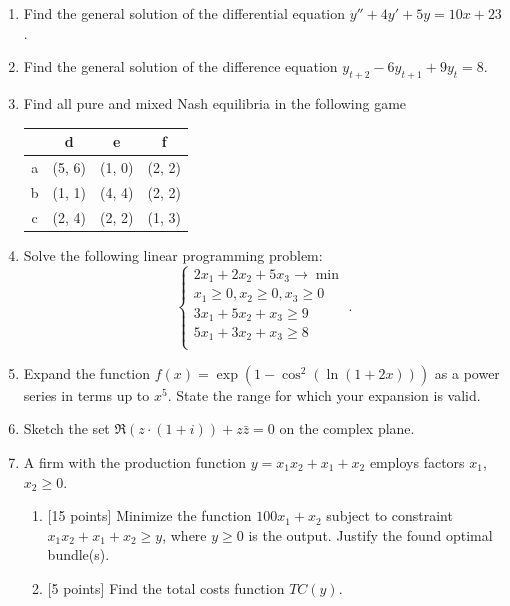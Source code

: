 \documentclass[12pt]{article} %
\theoremstyle{definition} %
\begin{document}
\begin{enumerate}
\item Find the general solution of the differential equation $y'' + 4y' + 5y = 10x+23$.
\item Find the general solution of the difference equation $y_{t+2} - 6y_{t+1} + 9y_t = 8$.
\item Find all pure and mixed Nash equilibria in the following game

\begin{center}
\begin{tabular}{@{}cccc@{}}
\toprule
  & d & e & f \\ \midrule
a & (5, 6) & (1, 0)  & (2, 2)   \\
b & (1, 1) & (4, 4) & (2, 2)   \\
c & (2, 4) & (2, 2) & (1, 3)   \\ \bottomrule
\end{tabular}
\end{center}

\item Solve the following linear programming problem:
\[
\begin{cases}
2x_1 + 2x_2 + 5x_3 \to \min \\
x_1 \geq 0, x_2 \geq 0, x_3 \geq 0 \\
3x_1 + 5x_2 + x_3 \geq 9 \\
5x_1 + 3x_2 + x_3 \geq 8 \\
\end{cases}.
\]

\item Expand the function $f(x) = \exp(1 - \cos^2 (\ln(1 + 2x)))$ as a power series in terms up to $x^5$.
  State the range for which your expansion is valid.

\item Sketch the set $\Re(z\cdot (1+i))+z\bar z =0$ on the complex plane.

\item A firm with the production function $y=x_1x_2+x_1+x_2$ employs factors $x_1$, $x_2 \geq 0$.
	  \begin{enumerate}[label=\alph*)]
	    \item {[15 points]} Minimize the function $100x_1+x_2$  subject to constraint  $x_1x_2+x_1+x_2 \geq y$, where  $y\geq 0$ is the output.
	      Justify the found optimal bundle(s).
	    \item {[5 points]} Find the total costs function  $TC(y)$.
	  \end{enumerate}


\end{enumerate}
\end{document}
